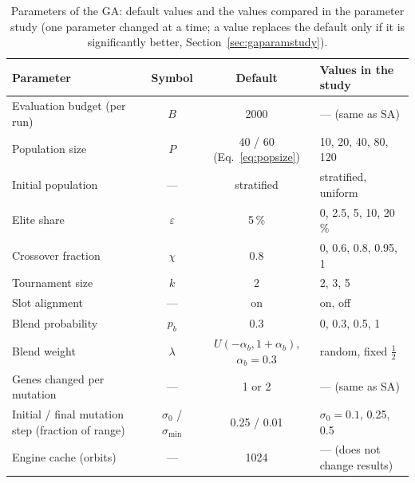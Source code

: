 \begin{table}[htbp]
\centering
\caption{Parameters of the \ac{GA}: default values and the values compared in the parameter study
(one parameter changed at a time; a value replaces the default only if it is significantly better,
Section~\ref{sec:gaparamstudy}).}
\label{tab:gaparams}
\footnotesize
\begin{tabularx}{\textwidth}{@{}Xccl@{}}
\toprule
Parameter & Symbol & Default & Values in the study \\
\midrule
Evaluation budget (per run) & $B$ & 2000 & --- (same as \ac{SA}) \\
Population size & $P$ & 40 / 60 (Eq.~\ref{eq:popsize}) & 10, 20, 40, 80, 120 \\
Initial population & --- & stratified & stratified, uniform \\
Elite share & $\varepsilon$ & 5\,\% & 0, 2.5, 5, 10, 20\,\% \\
Crossover fraction & $\chi$ & 0.8 & 0, 0.6, 0.8, 0.95, 1 \\
Tournament size & $k$ & 2 & 2, 3, 5 \\
Slot alignment & --- & on & on, off \\
Blend probability & $p_b$ & 0.3 & 0, 0.3, 0.5, 1 \\
Blend weight & $\lambda$ & $U(-\alpha_b,1+\alpha_b)$, $\alpha_b=0.3$ & random, fixed $\tfrac12$ \\
Genes changed per mutation & --- & 1 or 2 & --- (same as \ac{SA}) \\
Initial / final mutation step (fraction of range) & $\sigma_0$ / $\sigma_{\min}$ & 0.25 / 0.01 & $\sigma_0=0.1$, 0.25, 0.5 \\
Engine cache (orbits) & --- & 1024 & --- (does not change results) \\
\bottomrule
\end{tabularx}
\end{table}
